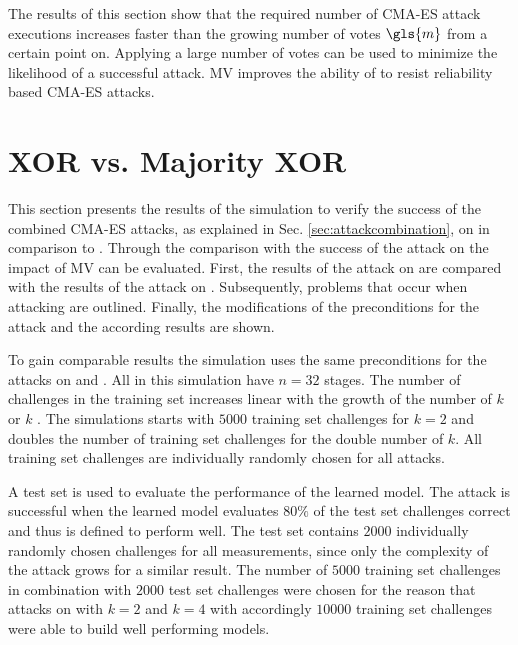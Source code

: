 The results of this section show that the required number of \ac{CMA-ES} attack executions increases faster than the growing number of votes $\gls{m}$ from a certain point on.
Applying a large number of votes can be used to minimize the likelihood of a successful attack.
\ac{MV} improves the ability of \apufs to resist reliability based \ac{CMA-ES} attacks.


\section{\acs{XOR} \apufs vs. Majority \acs{XOR} \apufs}
\label{sec:xorarbitervsmajorityxorarbiter}


This section presents the results of the simulation to verify the success of the combined \ac{CMA-ES} attacks, as explained in Sec. \ref{sec:attackcombination}, on \mxpufs in comparison to \xpufs.
Through the comparison with the success of the attack on \xpuf the impact of \ac{MV} can be evaluated.
First, the results of the attack on \xpufs are compared with the results of the attack on \mpufs.
Subsequently, problems that occur when attacking \mpufs are outlined.
Finally, the modifications of the preconditions for the attack and the according results are shown.

To gain comparable results the simulation uses the same preconditions for the attacks on \xpufs and \mxpufs.
All \pufs in this simulation have $n = 32$ stages.
The number of challenges in the training set increases linear with the growth of the number of $k$ \apufs or $k$ \mpufs.
The simulations starts with $5000$ training set challenges for $k = 2$ and doubles the number of training set challenges for the double number of $k$.
All training set challenges are individually randomly chosen for all attacks.

A test set is used to evaluate the performance of the learned model.
The attack is successful when the learned model evaluates $80 \%$ of the test set challenges correct and thus is defined to perform well.
The test set contains $2000$ individually randomly chosen challenges for all measurements, since only the complexity of the attack grows for a similar result.
The number of $5000$ training set challenges in combination with $2000$ test set challenges were chosen for the reason that attacks on \xpufs with $k = 2$ and $k = 4$ with accordingly $10000$ training set challenges were able to build well performing models.

